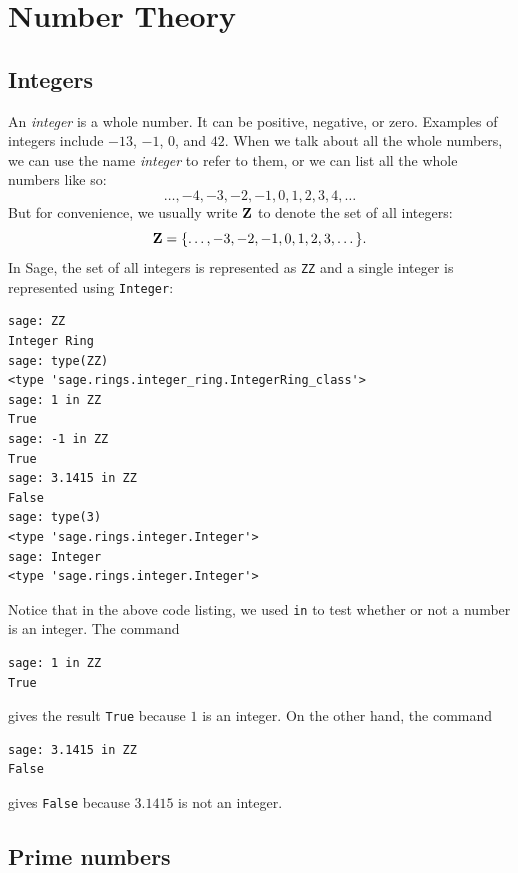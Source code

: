 
\chapter{Number Theory}



\section{Integers}

An \emph{integer} is a whole number. It can be
positive, negative, or zero. Examples of integers include $-13$, $-1$,
$0$, and $42$. When we talk about all the whole numbers, we can use
the name \emph{integer} to refer to them, or we can
list all the whole numbers like so:
\[
\dots, -4, -3, -2, -1, 0, 1, 2, 3, 4, \dots
\]
But for convenience, we usually write $\ZZ$\index{$\ZZ$} to denote the
set of all integers:
\[
\mathbf{Z}
=
\{\dots, -3, -2, -1, 0, 1, 2, 3, \dots\}.
\]
In Sage, the set of all integers is represented as \verb!ZZ! and a
single integer is represented using \verb!Integer!:
%
\begin{lstlisting}
sage: ZZ
Integer Ring
sage: type(ZZ)
<type 'sage.rings.integer_ring.IntegerRing_class'>
sage: 1 in ZZ
True
sage: -1 in ZZ
True
sage: 3.1415 in ZZ
False
sage: type(3)
<type 'sage.rings.integer.Integer'>
sage: Integer
<type 'sage.rings.integer.Integer'>
\end{lstlisting}
%
Notice that in the above code listing, we used \verb!in! to test
whether or not a number is an integer. The command
%
\begin{lstlisting}
sage: 1 in ZZ
True
\end{lstlisting}
%
gives the result \verb!True! because $1$ is an integer. On the other
hand, the command
%
\begin{lstlisting}
sage: 3.1415 in ZZ
False
\end{lstlisting}
%
gives \verb!False! because $3.1415$ is not an integer.



\section{Prime numbers}

